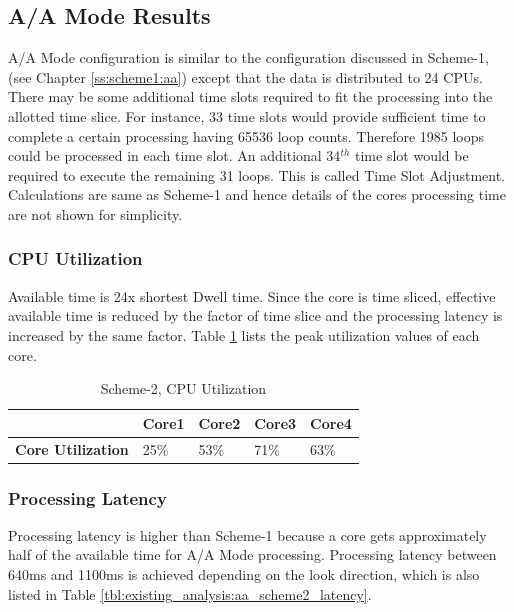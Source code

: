 \subsection{A/A Mode Results}
\label{ss:scheme2:aa}
A/A Mode configuration is similar to the configuration discussed in Scheme-1, (see Chapter \ref{ss:scheme1:aa}) except that the data is distributed to 24 CPUs. There may be some additional time slots required to fit the processing into the allotted time slice. For instance, 33 time slots would provide sufficient time to complete a certain processing having 65536 loop counts. Therefore 1985 loops could be processed in each time slot. An additional 34$^{th}$ time slot would be required to execute the remaining 31 loops. This is called Time Slot Adjustment. Calculations are same as Scheme-1 and hence details of the cores processing time are not shown for simplicity.

\subsubsection{CPU Utilization}
\label{sss:scheme2:cpu_util}
Available time is 24x shortest Dwell time. Since the core is time sliced, effective available time is reduced by the factor of time slice and the processing latency is increased by the same factor. Table \ref{tbl:existing_analysis:aa_scheme2_cpu_util} lists the peak utilization values of each core.

\begin{table}[h!]
	\centering
	\begin{tabular}{|l|l|l|l|l|} 
	 \hline
	 & \textbf{Core1} & \textbf{Core2} & \textbf{Core3} & \textbf{Core4} \\ \hline
	 \textbf{Core Utilization} & 25\% & 53\% & 71\% & 63\% \\ \hline
	\end{tabular}
	\caption{Scheme-2, CPU Utilization}
	\label{tbl:existing_analysis:aa_scheme2_cpu_util}
\end{table}

\subsubsection{Processing Latency}
\label{sss:scheme2:latency}
Processing latency is higher than Scheme-1 because a core gets approximately half of the available time for A/A Mode processing. Processing latency between 640ms and 1100ms is achieved depending on the look direction, which is also listed in Table \ref{tbl:existing_analysis:aa_scheme2_latency}.

